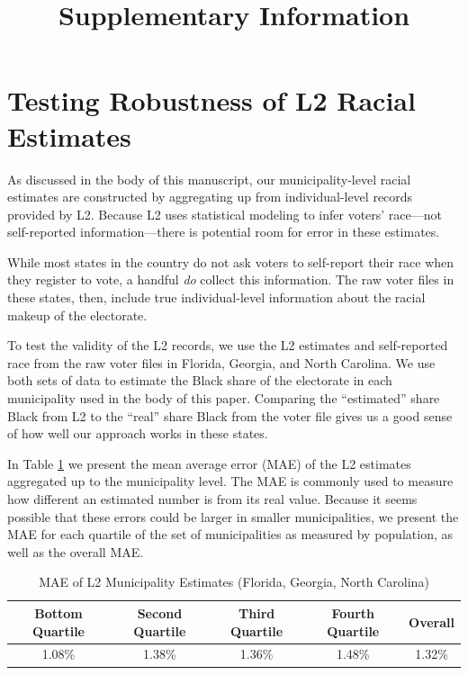 \documentclass[
  12pt,
]{article}
\title{Supplementary Information}
\author{}
\date{\vspace{-2.5em}}
\begin{document}
\maketitle

{
\setcounter{tocdepth}{2}
\tableofcontents
}
\doublespacing

\hypertarget{testing-robustness-of-l2-racial-estimates}{%
\section*{Testing Robustness of L2 Racial Estimates}\label{testing-robustness-of-l2-racial-estimates}}

As discussed in the body of this manuscript, our municipality-level racial estimates are constructed by aggregating up from individual-level records provided by L2. Because L2 uses statistical modeling to infer voters' race---not self-reported information---there is potential room for error in these estimates.

While most states in the country do not ask voters to self-report their race when they register to vote, a handful \emph{do} collect this information. The raw voter files in these states, then, include true individual-level information about the racial makeup of the electorate.

To test the validity of the L2 records, we use the L2 estimates and self-reported race from the raw voter files in Florida, Georgia, and North Carolina. We use both sets of data to estimate the Black share of the electorate in each municipality used in the body of this paper. Comparing the ``estimated'' share Black from L2 to the ``real'' share Black from the voter file gives us a good sense of how well our approach works in these states.

In Table \ref{tab:mae} we present the mean average error (MAE) of the L2 estimates aggregated up to the municipality level. The MAE is commonly used to measure how different an estimated number is from its real value. Because it seems possible that these errors could be larger in smaller municipalities, we present the MAE for each quartile of the set of municipalities as measured by population, as well as the overall MAE.

\begin{singlespace}
\begin{table}[H]

\caption{\label{tab:mae-chunck}\label{tab:mae} MAE of L2 Municipality Estimates (Florida, Georgia, North Carolina)}
\centering
\begin{tabular}[t]{ccccc}
\toprule
Bottom Quartile & Second Quartile & Third Quartile & Fourth Quartile & Overall\\
\midrule
1.08\% & 1.38\% & 1.36\% & 1.48\% & 1.32\%\\
\bottomrule
\end{tabular}
\end{table}
\end{singlespace}
\end{document}
